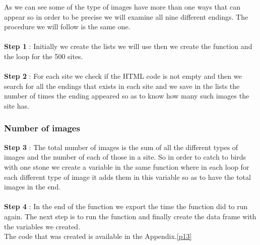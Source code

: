 \documentclass{book}
\begin{document}
As we can see some of the type of images have more than one ways that can appear so in order to be precise we will examine all nine different endings. The procedure we will follow is the same one. \\\\
\textbf{Step 1} : Initially we create the lists we will use then we create the function and the loop for the 500 sites.\\\\
\textbf{Step 2} :  For each site we check if the HTML code is not empty and then we search for all the endings that exists in each site and we save in the lists the number of times the ending appeared so as to know how many such images the site has.
\subsubsection{Number of images}
\textbf{Step 3} : The total number of images is the sum of all the different types of images and the number of each of those in a site. So in order to catch to birds with one stone we create a variable in the same function where in each loop for each different type of image it adds them in this variable so as to have the total images in the end.\\\\
\textbf{Step 4} : In the end of the function we export the time the function did to run again. The next step is to run the function and finally create the data frame with the variables we created.\\
The code that was created is available in the Appendix.\ref{p13}
\end{document}
